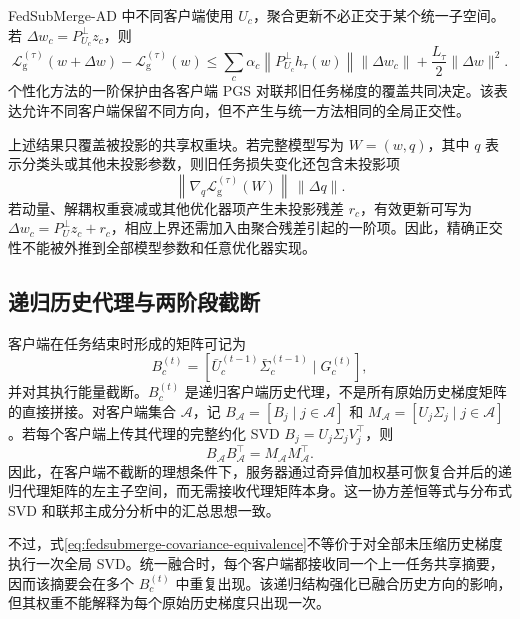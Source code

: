 FedSubMerge-AD 中不同客户端使用 $U_c$，聚合更新不必正交于某个统一子空间。若 $\Delta w_c=P_{U_c}^{\perp}z_c$，则
\begin{equation}
\mathcal{L}_{\mathrm g}^{(\tau)}(w+\Delta w)
-
\mathcal{L}_{\mathrm g}^{(\tau)}(w)
\leq
\sum_c\alpha_c
\left\|P_{U_c}^{\perp}h_{\tau}(w)\right\|
\|\Delta w_c\|
+
\frac{L_{\tau}}{2}\|\Delta w\|^2.
\label{eq:fedsubmerge-personalized-loss-bound}
\end{equation}
个性化方法的一阶保护由各客户端 PGS 对联邦旧任务梯度的覆盖共同决定。该表达允许不同客户端保留不同方向，但不产生与统一方法相同的全局正交性。

上述结果只覆盖被投影的共享权重块。若完整模型写为 $W=(w,q)$，其中 $q$ 表示分类头或其他未投影参数，则旧任务损失变化还包含未投影项
\[
\left\|\nabla_q\mathcal{L}_{\mathrm g}^{(\tau)}(W)\right\|\,
\left\|\Delta q\right\|.
\]
若动量、解耦权重衰减或其他优化器项产生未投影残差 $r_c$，有效更新可写为
$\Delta w_c=P_U^{\perp}z_c+r_c$，相应上界还需加入由聚合残差引起的一阶项。因此，精确正交性不能被外推到全部模型参数和任意优化器实现。

\subsection{递归历史代理与两阶段截断}
\label{subsec:fedsubmerge-theory-compression}

客户端在任务结束时形成的矩阵可记为
\begin{equation}
B_c^{(t)}
=
\left[
\bar U_c^{(t-1)}\bar\Sigma_c^{(t-1)}
\mid
G_c^{(t)}
\right],
\label{eq:fedsubmerge-recursive-proxy}
\end{equation}
并对其执行能量截断。$B_c^{(t)}$ 是递归客户端历史代理，不是所有原始历史梯度矩阵的直接拼接。对客户端集合 $\mathcal{A}$，记
$B_{\mathcal{A}}=[B_j\mid j\in\mathcal{A}]$ 和
$M_{\mathcal{A}}=[U_j\Sigma_j\mid j\in\mathcal{A}]$。若每个客户端上传其代理的完整约化 SVD
$B_j=U_j\Sigma_jV_j^{\top}$，则
\begin{equation}
B_{\mathcal{A}}B_{\mathcal{A}}^{\top}
=
M_{\mathcal{A}}M_{\mathcal{A}}^{\top}.
\label{eq:fedsubmerge-covariance-equivalence}
\end{equation}
因此，在客户端不截断的理想条件下，服务器通过奇异值加权基可恢复合并后的递归代理矩阵的左主子空间，而无需接收代理矩阵本身。这一协方差恒等式与分布式 SVD 和联邦主成分分析中的汇总思想一致\cite{iwen2016distributedSVD,grammenos2020federatedPCA}。

不过，式\eqref{eq:fedsubmerge-covariance-equivalence}不等价于对全部未压缩历史梯度执行一次全局 SVD。统一融合时，每个客户端都接收同一个上一任务共享摘要，因而该摘要会在多个 $B_c^{(t)}$ 中重复出现。该递归结构强化已融合历史方向的影响，但其权重不能解释为每个原始历史梯度只出现一次。

